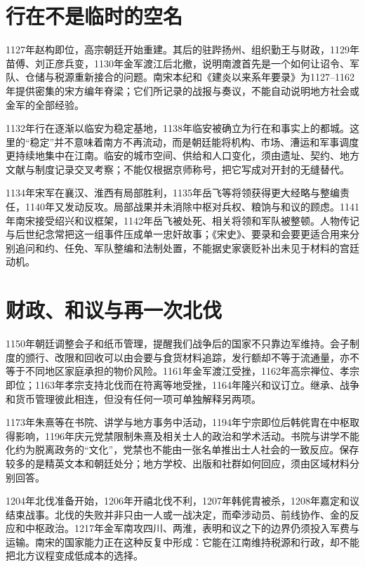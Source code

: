 \section{行在不是临时的空名}

1127年赵构即位，高宗朝廷开始重建。其后的驻跸扬州、组织勤王与财政，1129年苗傅、刘正彦兵变，1130年金军渡江后北撤，说明南渡首先是一个如何让诏令、军队、仓储与税源重新接合的问题。南宋本纪和《建炎以来系年要录》为1127--1162年提供密集的宋方编年脊梁；它们所记录的战报与奏议，不能自动说明地方社会或金军的全部经验。

1132年行在逐渐以临安为稳定基地，1138年临安被确立为行在和事实上的都城。这里的“稳定”并不意味着南方不再流动，而是朝廷能将机构、市场、漕运和军事调度更持续地集中在江南。临安的城市空间、供给和人口变化，须由遗址、契约、地方文献与制度记录交叉考察；不能仅根据京师称号，把它写成对开封的无缝替代。

1134年宋军在襄汉、淮西有局部胜利，1135年岳飞等将领获得更大经略与整编责任，1140年又发动反攻。局部战果并未消除中枢对兵权、粮饷与和议的顾虑。1141年南宋接受绍兴和议框架，1142年岳飞被处死、相关将领和军队被整顿。人物传记与后世纪念常把这一组事件压成单一忠奸故事；《宋史》、要录和会要更适合用来分别追问和约、任免、军队整编和法制处置，不能据史家褒贬补出未见于材料的宫廷动机。

\section{财政、和议与再一次北伐}

1150年朝廷调整会子和纸币管理，提醒我们战争后的国家不只靠边军维持。会子制度的颁行、改限和回收可以由会要与食货材料追踪，发行额却不等于流通量，亦不等于不同地区家庭承担的物价风险。1161年金军渡江受挫，1162年高宗禅位、孝宗即位；1163年孝宗支持北伐而在符离等地受挫，1164年隆兴和议订立。继承、战争和货币管理彼此相连，但没有任何一项可单独解释另两项。

1173年朱熹等在书院、讲学与地方事务中活动，1194年宁宗即位后韩侂胄在中枢取得影响，1196年庆元党禁限制朱熹及相关士人的政治和学术活动。书院与讲学不能化约为脱离政务的“文化”，党禁也不能由一张名单推出士人社会的一致反应。保存较多的是精英文本和朝廷处分；地方学校、出版和社群如何回应，须由区域材料分别回答。

1204年北伐准备开始，1206年开禧北伐不利，1207年韩侂胄被杀，1208年嘉定和议结束战事。北伐的失败并非只由一人或一战决定，而牵涉动员、前线协作、金的反应和中枢政治。1217年金军南攻四川、两淮，表明和议之下的边界仍须投入军费与运输。南宋的国家能力正在这种反复中形成：它能在江南维持税源和行政，却不能把北方议程变成低成本的选择。

